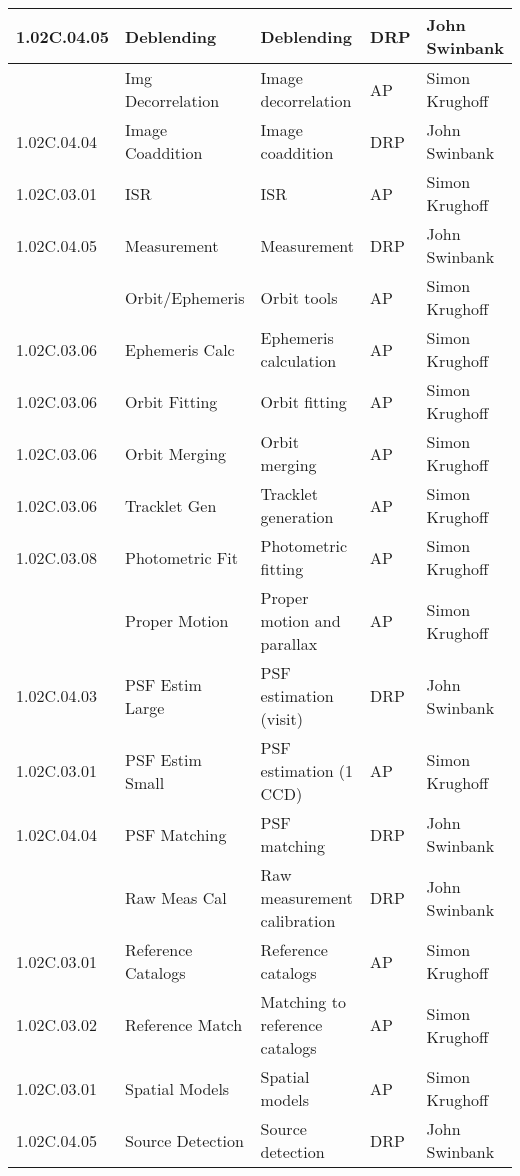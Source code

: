 \begin{longtable}{|p{}|p{}|p{}|p{}|p{}|}
{\tiny 1.02C.04.05} & \small Deblending & Deblending & DRP & John Swinbank\\ \hline 
{\tiny } & \small Img Decorrelation & Image decorrelation & AP & Simon Krughoff\\ \hline 
{\tiny 1.02C.04.04} & \small Image Coaddition & Image coaddition & DRP & John Swinbank\\ \hline 
{\tiny 1.02C.03.01} & \small ISR & ISR & AP & Simon Krughoff\\ \hline 
{\tiny 1.02C.04.05} & \small Measurement & Measurement & DRP & John Swinbank\\ \hline 
{\tiny } & \small Orbit/Ephemeris & Orbit tools & AP & Simon Krughoff\\ \hline 
{\tiny 1.02C.03.06} & \small Ephemeris Calc & Ephemeris calculation & AP & Simon Krughoff\\ \hline 
{\tiny 1.02C.03.06} & \small Orbit Fitting & Orbit fitting & AP & Simon Krughoff\\ \hline 
{\tiny 1.02C.03.06} & \small Orbit Merging & Orbit merging & AP & Simon Krughoff\\ \hline 
{\tiny 1.02C.03.06} & \small Tracklet Gen & Tracklet generation & AP & Simon Krughoff\\ \hline 
{\tiny 1.02C.03.08} & \small Photometric Fit & Photometric fitting & AP & Simon Krughoff\\ \hline 
{\tiny } & \small Proper Motion & Proper motion and parallax & AP & Simon Krughoff\\ \hline 
{\tiny 1.02C.04.03} & \small PSF Estim Large & PSF estimation (visit) & DRP & John Swinbank\\ \hline 
{\tiny 1.02C.03.01} & \small PSF Estim Small & PSF estimation (1 CCD) & AP & Simon Krughoff\\ \hline 
{\tiny 1.02C.04.04} & \small PSF Matching & PSF matching & DRP & John Swinbank\\ \hline 
{\tiny } & \small Raw Meas Cal & Raw measurement calibration & DRP & John Swinbank\\ \hline 
{\tiny 1.02C.03.01} & \small Reference Catalogs & Reference catalogs & AP & Simon Krughoff\\ \hline 
{\tiny 1.02C.03.02} & \small Reference Match & Matching to reference catalogs & AP & Simon Krughoff\\ \hline 
{\tiny 1.02C.03.01} & \small Spatial Models & Spatial models & AP & Simon Krughoff\\ \hline 
{\tiny 1.02C.04.05} & \small Source Detection & Source detection & DRP & John Swinbank\\ \hline 

\end{longtable}
